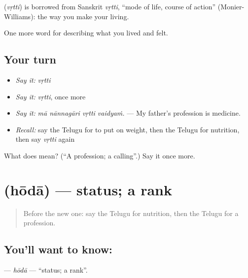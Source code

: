\begin{cousinweb}
\textbf{} (\emph{vṛtti}) is borrowed from Sanskrit \emph{vṛtti}, \textquotedblleft{}mode of life, course of action\textquotedblright{} (Monier-Williams): the way you make your living.
\end{cousinweb}

\begin{grammarlens}[title={What you've built}]
One more word for describing what you lived and felt.
\end{grammarlens}

\subsection*{Your turn}
\begin{itemize}
\raggedright
  \item \emph{Say it:} \emph{vṛtti}
  \item \emph{Say it:} \emph{vṛtti}, once more
  \item \emph{Say it:} \emph{mā nānnagāri vṛtti vaidyaṁ.} — My father's profession is medicine.
  \item \emph{Recall:} say the Telugu for to put on weight, then the Telugu for nutrition, then say \emph{vṛtti} again
\end{itemize}

\begin{tcolorbox}[breakable,colback=teal!4,colframe=teal!35!black,title={Before you move on}]
What does  mean? (\textquotedblleft{}A profession; a calling\textquotedblright{}.) Say it once more.
\end{tcolorbox}
\section[\texorpdfstring{\te{హోదా} (hōdā)}{హోదా (hōdā)}]{ (hōdā) — status; a rank}

\label{lesson:TE-C522-hoda}



\begin{quote}
Before the new one: say the Telugu for nutrition, then the Telugu for a profession.
\end{quote}

\subsection*{You'll want to know: }
\textbf{} — \emph{hōdā} — \textquotedblleft{}status; a rank\textquotedblright{}.

